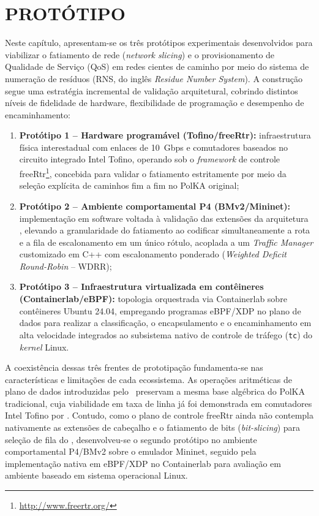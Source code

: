 \chapter{PROTÓTIPO}
\label{chap:prototipos}

Neste capítulo, apresentam-se os três protótipos experimentais desenvolvidos para viabilizar o fatiamento de rede (\textit{network slicing}) e o provisionamento de Qualidade de Serviço (QoS) em redes cientes de caminho por meio do sistema de numeração de resíduos (RNS, do inglês \textit{Residue Number System}). A construção segue uma estratégia incremental de validação arquitetural, cobrindo distintos níveis de fidelidade de hardware, flexibilidade de programação e desempenho de encaminhamento:

\begin{enumerate}
    \item \textbf{Protótipo 1 -- Hardware programável (Tofino/freeRtr):} infraestrutura física interestadual com enlaces de 10~Gbps e comutadores baseados no circuito integrado Intel Tofino\textregistered, operando sob o \textit{framework} de controle freeRtr\footnote{\url{http://www.freertr.org/}}, concebida para validar o fatiamento estritamente por meio da seleção explícita de caminhos fim a fim no PolKA original;
    \item \textbf{Protótipo 2 -- Ambiente comportamental P4 (BMv2/Mininet):} implementação em software voltada à validação das extensões da arquitetura \nome, elevando a granularidade do fatiamento ao codificar simultaneamente a rota e a fila de escalonamento em um único rótulo, acoplada a um \textit{Traffic Manager} customizado em C++ com escalonamento ponderado (\textit{Weighted Deficit Round-Robin} -- WDRR);
    \item \textbf{Protótipo 3 -- Infraestrutura virtualizada em contêineres (Containerlab/eBPF):} topologia orquestrada via Containerlab sobre contêineres Ubuntu 24.04, empregando programas eBPF/XDP no plano de dados para realizar a classificação, o encapsulamento e o encaminhamento em alta velocidade integrados ao subsistema nativo de controle de tráfego (\texttt{tc}) do \textit{kernel} Linux.
\end{enumerate}

A coexistência dessas três frentes de prototipação fundamenta-se nas características e limitações de cada ecossistema. As operações aritméticas de plano de dados introduzidas pelo \nome\ preservam a mesma base algébrica do PolKA tradicional, cuja viabilidade em taxa de linha já foi demonstrada em comutadores Intel Tofino por \textcite{dominicini2021}. Contudo, como o plano de controle freeRtr ainda não contempla nativamente as extensões de cabeçalho e o fatiamento de bits (\textit{bit-slicing}) para seleção de fila do \nome, desenvolveu-se o segundo protótipo no ambiente comportamental P4/BMv2 sobre o emulador Mininet, seguido pela implementação nativa em eBPF/XDP no Containerlab para avaliação em ambiente baseado em sistema operacional Linux.

